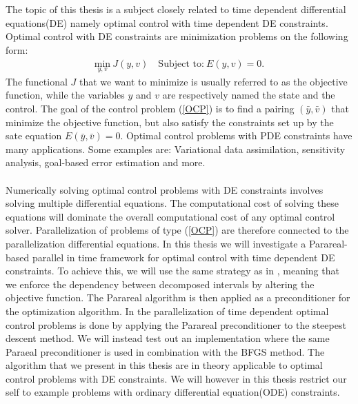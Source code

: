 \\
\\
The topic of this thesis is a subject closely related to time dependent differential equations(DE) namely optimal control with time dependent DE constraints. Optimal control with DE constraints are minimization problems on the following form:
\begin{align}
\underset{y,v}{\text{min}} \ J(y,v) \quad \textrm{Subject to:} \ E(y,v)=0. \label{OCP}
\end{align}
The functional $J$ that we want to minimize is usually referred to as the objective function, while the variables $y$ and $v$ are respectively named the state and the control. The goal of the control problem (\ref{OCP}) is to find a pairing $(\bar y,\bar v)$ that minimize the objective function, but also satisfy the constraints set up by the sate equation $ E(\bar y,\bar v)=0$. Optimal control problems with PDE constraints have many applications. Some examples are: Variational data assimilation, sensitivity analysis, goal-based error estimation and more.
\\
\\
Numerically solving optimal control problems with DE constraints involves solving multiple differential equations. The computational cost of solving these equations will dominate the overall computational cost of any optimal control solver. Parallelization of problems of type (\ref{OCP}) are therefore connected to the parallelization differential equations. In this thesis we will investigate a Parareal-based parallel in time framework for optimal control with time dependent DE constraints. To achieve this, we will use the same strategy as in \cite{maday2002parareal}, meaning that we enforce the dependency between decomposed intervals by altering the objective function. The Parareal algorithm is then applied as a preconditioner for the optimization algorithm. In \cite{maday2002parareal} the parallelization of time dependent optimal control problems is done by applying the Parareal preconditioner to the steepest descent method. We will instead test out an implementation where the same Paraeal preconditioner is used in combination with the BFGS method. The algorithm that we present in this thesis are in theory applicable to optimal control problems with DE constraints. We will however in this thesis restrict our self to example problems with ordinary differential equation(ODE) constraints.
